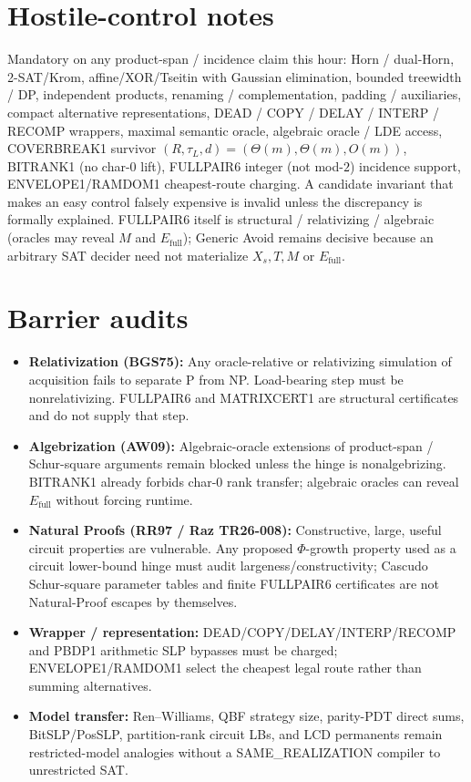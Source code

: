 \documentclass[11pt]{article}
\begin{document}
\section*{Hostile-control notes}
Mandatory on any product-span / incidence claim this hour: Horn / dual-Horn,
2-SAT/Krom, affine/XOR/Tseitin with Gaussian elimination, bounded treewidth / DP,
independent products, renaming / complementation, padding / auxiliaries, compact
alternative representations, DEAD / COPY / DELAY / INTERP / RECOMP wrappers,
maximal semantic oracle, algebraic oracle / LDE access, COVERBREAK1 survivor
$(R,\tau_L,d)=(\Theta(m),\Theta(m),O(m))$, BITRANK1 (no char-$0$ lift), FULLPAIR6
integer (not mod-$2$) incidence support, ENVELOPE1/RAMDOM1 cheapest-route
charging. A candidate invariant that makes an easy control falsely expensive is
invalid unless the discrepancy is formally explained. FULLPAIR6 itself is
structural / relativizing / algebraic (oracles may reveal $M$ and $E_{\mathrm{full}}$);
Generic Avoid remains decisive because an arbitrary SAT decider need not materialize
$X_s,T,M$ or $E_{\mathrm{full}}$.

\section*{Barrier audits}
\begin{itemize}
\item \textbf{Relativization (BGS75):} Any oracle-relative or relativizing simulation
of acquisition fails to separate P from NP. Load-bearing step must be nonrelativizing.
FULLPAIR6 and MATRIXCERT1 are structural certificates and do not supply that step.
\item \textbf{Algebrization (AW09):} Algebraic-oracle extensions of product-span /
Schur-square arguments remain blocked unless the hinge is nonalgebrizing.
BITRANK1 already forbids char-$0$ rank transfer; algebraic oracles can reveal
$E_{\mathrm{full}}$ without forcing runtime.
\item \textbf{Natural Proofs (RR97 / Raz TR26-008):} Constructive, large, useful
circuit properties are vulnerable. Any proposed $\Phi$-growth property used as a
circuit lower-bound hinge must audit largeness/constructivity; Cascudo Schur-square
parameter tables and finite FULLPAIR6 certificates are not Natural-Proof escapes by
themselves.
\item \textbf{Wrapper / representation:} DEAD/COPY/DELAY/INTERP/RECOMP and PBDP1
arithmetic SLP bypasses must be charged; ENVELOPE1/RAMDOM1 select the cheapest legal
route rather than summing alternatives.
\item \textbf{Model transfer:} Ren--Williams, QBF strategy size, parity-PDT direct
sums, BitSLP/PosSLP, partition-rank circuit LBs, and LCD permanents remain
restricted-model analogies without a SAME\_REALIZATION compiler to unrestricted SAT.
\end{itemize}
\end{document}

